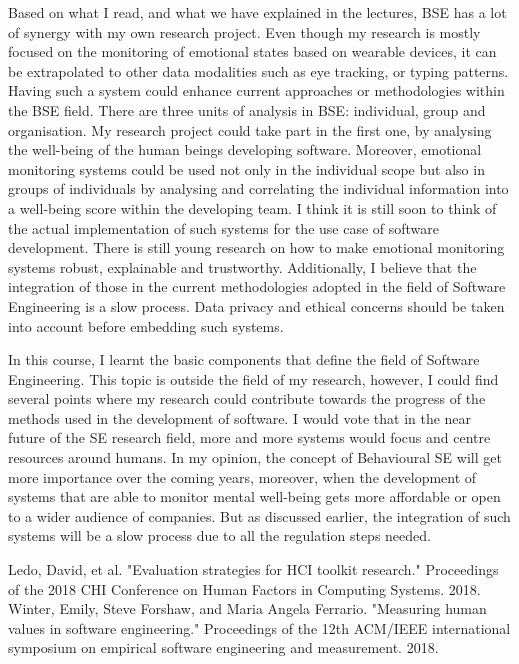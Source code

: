 \documentclass[11pt]{article}
\begin{document}
Based on what I read, and what we have explained in the lectures, BSE has a lot of synergy with my own research project. Even though my research is mostly focused on the monitoring of emotional states based on wearable devices, it can be extrapolated to other data modalities such as eye tracking, or typing patterns. Having such a system could enhance current approaches or methodologies within the BSE field. There are three units of analysis in BSE: individual, group and organisation. My research project could take part in the first one, by analysing the well-being of the human beings developing software. Moreover, emotional monitoring systems could be used not only in the individual scope but also in groups of individuals by analysing and correlating the individual information into a well-being score within the developing team.
I think it is still soon to think of the actual implementation of such systems for the use case of software development. There is still young research on how to make emotional monitoring systems robust, explainable and trustworthy. Additionally, I believe that the integration of those in the current methodologies adopted in the field of Software Engineering is a slow process. Data privacy and ethical concerns should be taken into account before embedding such systems.

In this course, I learnt the basic components that define the field of Software Engineering. This topic is outside the field of my research, however, I could find several points where my research could contribute towards the progress of the methods used in the development of software. I would vote that in the near future of the SE research field, more and more systems would focus and centre resources around humans. In my opinion, the concept of Behavioural SE will get more importance over the coming years, moreover, when the development of systems that are able to monitor mental well-being gets more affordable or open to a wider audience of companies. But as discussed earlier, the integration of such systems will be a slow process due to all the regulation steps needed.


\begin{thebibliography}{}
 Ledo, David, et al. "Evaluation strategies for HCI toolkit research." Proceedings of the 2018 CHI Conference on Human Factors in Computing Systems. 2018.
 Winter, Emily, Steve Forshaw, and Maria Angela Ferrario. "Measuring human values in software engineering." Proceedings of the 12th ACM/IEEE international symposium on empirical software engineering and measurement. 2018.

\end{thebibliography}
\end{document}
